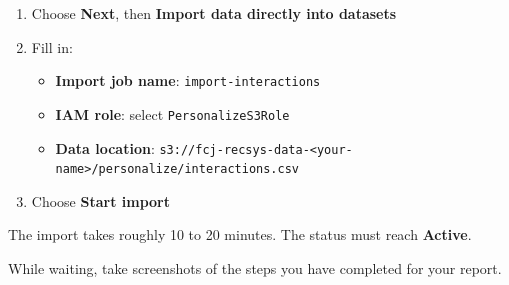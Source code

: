 \begin{Shaded}
\begin{Highlighting}[]
\FunctionTok{\{}
  \FunctionTok{:} \FunctionTok{,}
  \FunctionTok{:} \FunctionTok{,}
  \FunctionTok{:} \FunctionTok{,}
  \FunctionTok{:} \OtherTok{[}
    \FunctionTok{\{} \FunctionTok{:} \FunctionTok{,} \FunctionTok{:}  \FunctionTok{\}}\OtherTok{,}
    \FunctionTok{\{} \FunctionTok{:} \FunctionTok{,} \FunctionTok{:}  \FunctionTok{\}}\OtherTok{,}
    \FunctionTok{\{} \FunctionTok{:} \FunctionTok{,} \FunctionTok{:}  \FunctionTok{\}}\OtherTok{,}
    \FunctionTok{\{} \FunctionTok{:} \FunctionTok{,} \FunctionTok{:}  \FunctionTok{\}}
  \OtherTok{]}\FunctionTok{,}
  \FunctionTok{:} 
\FunctionTok{\}}
\end{Highlighting}
\end{Shaded}

\begin{enumerate}
\def\labelenumi{\arabic{enumi}.}
\setcounter{enumi}{3}
\tightlist
\item
  Choose \textbf{Next}, then \textbf{Import data directly into datasets}
\item
  Fill in:

  \begin{itemize}
  \tightlist
  \item
    \textbf{Import job name}: \texttt{import-interactions}
  \item
    \textbf{IAM role}: select \texttt{PersonalizeS3Role}
  \item
    \textbf{Data location}:
    \texttt{s3://fcj-recsys-data-\textless{}your-name\textgreater{}/personalize/interactions.csv}
  \end{itemize}
\item
  Choose \textbf{Start import}
\end{enumerate}

The import takes roughly 10 to 20 minutes. The status must reach
\textbf{Active}.

While waiting, take screenshots of the steps you have completed for your
report.

